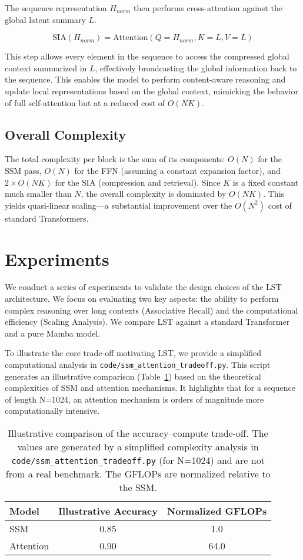 \documentclass[10pt,twocolumn,letterpaper]{article}
\begin{document}
The sequence representation \(H_{norm}\) then performs cross-attention against the global latent summary \(L\).

\begin{equation}
\text{SIA}(H_{norm}) = \text{Attention}(Q=H_{norm}, K=L, V=L)
\end{equation}

This step allows every element in the sequence to access the compressed global context summarized in \(L\), effectively broadcasting the global information back to the sequence. This enables the model to perform content-aware reasoning and update local representations based on the global context, mimicking the behavior of full self-attention but at a reduced cost of \(O(NK)\).

\subsection{Overall Complexity}

The total complexity per block is the sum of its components: \(O(N)\) for the SSM pass, \(O(N)\) for the FFN (assuming a constant expansion factor), and \(2\times O(NK)\) for the SIA (compression and retrieval). Since \(K\) is a fixed constant much smaller than \(N\), the overall complexity is dominated by \(O(NK)\). This yields quasi-linear scaling—a substantial improvement over the \(O(N^{2})\) cost of standard Transformers.

\section{Experiments}

We conduct a series of experiments to validate the design choices of the LST architecture. We focus on evaluating two key aspects: the ability to perform complex reasoning over long contexts (Associative Recall) and the computational efficiency (Scaling Analysis). We compare LST against a standard Transformer and a pure Mamba model.

To illustrate the core trade-off motivating LST, we provide a simplified computational analysis in \texttt{code/ssm\_attention\_tradeoff.py}. This script generates an illustrative comparison (Table~\ref{tab:ssm_attn_tradeoff}) based on the theoretical complexities of SSM and attention mechanisms. It highlights that for a sequence of length N=1024, an attention mechanism is orders of magnitude more computationally intensive.

\begin{table}[h]
\centering
\begin{tabular}{@{}lcc@{}}
\toprule
Model & Illustrative Accuracy & Normalized GFLOPs \\
\midrule
SSM & 0.85 & 1.0 \\
Attention & 0.90 & 64.0 \\
\bottomrule
\end{tabular}
\caption{Illustrative comparison of the accuracy--compute trade-off. The values are generated by a simplified complexity analysis in \texttt{code/ssm\_attention\_tradeoff.py} (for N=1024) and are not from a real benchmark. The GFLOPs are normalized relative to the SSM.}
\label{tab:ssm_attn_tradeoff}
\end{table}
\end{document}
